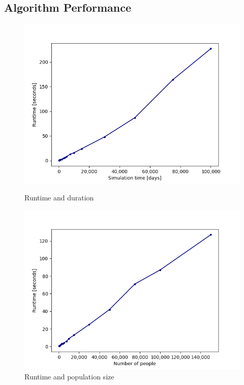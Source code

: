 \documentclass[11pt]{article}
\begin{document}
\subsection{Algorithm Performance}
\begin{figure}
\centering
\begin{minipage}{.5\textwidth}
  \centering
  \includegraphics[width=1\linewidth]{runtimedays}
  \caption{Runtime and duration}  
  \label{fig:10}
  
\end{minipage}%
\begin{minipage}{.5\textwidth}
  \centering
  \includegraphics[width=1\linewidth]{runtimepopulation}
  \caption{Runtime and population size}
  \label{fig:11}
 
\end{minipage}%
\end{figure}
\end{document}
